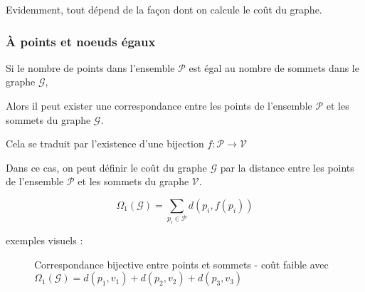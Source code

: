 \documentclass[12pt,a4paper]{article}
\begin{document}
Evidemment, tout dépend de la façon dont on calcule le coût du graphe.


\subsubsection{À points et noeuds égaux}

Si le nombre de points dans l'ensemble $\mathcal{P}$ est égal au nombre de sommets dans le graphe $\mathcal{G}$,

Alors il peut exister une correspondance entre les points de l'ensemble $\mathcal{P}$ et les sommets du graphe $\mathcal{G}$.

Cela se traduit par l'existence d'une bijection $f : \mathcal{P} \to \mathcal{V}$

Dans ce cas, on peut définir le coût du graphe $\mathcal{G}$ par la distance entre les points de l'ensemble $\mathcal{P}$ et les sommets du graphe $\mathcal{V}$.

\begin{equation*}
    \Omega_1(\mathcal{G}) = \sum_{p_i \in \mathcal{P}} d(p_i, f(p_i))
\end{equation*}

exemples visuels :
\begin{figure}[H]
\centering
{}
\caption{Correspondance bijective entre points et sommets - coût faible avec $\Omega_1(\mathcal{G}) = d(p_1,v_1) + d(p_2,v_2) + d(p_3,v_3)$}
\end{figure}
\end{document}
